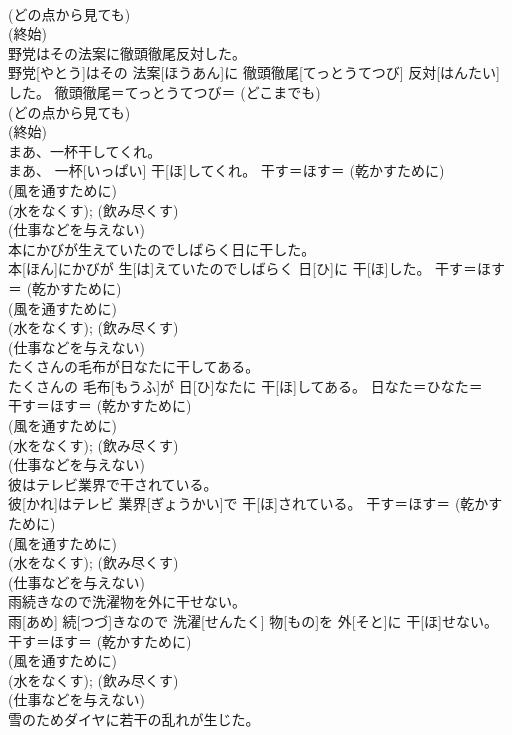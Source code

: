 \documentclass[8pt]{extreport}
\begin{document}
\begin{CJK}{UTF8}{min}
{\\	(どの点から見ても) 
\\	(終始) 
\\	野党はその法案に徹頭徹尾反対した。	
\\	野党[やとう]はその 法案[ほうあん]に 徹頭徹尾[てっとうてつび] 反対[はんたい]した。	徹頭徹尾＝てっとうてつび＝ (どこまでも) 
\\	(どの点から見ても) 
\\	(終始) 
\\	まあ、一杯干してくれ。	
\\	まあ、 一杯[いっぱい] 干[ほ]してくれ。	干す＝ほす＝ (乾かすために) 
\\	(風を通すために) 
\\	(水をなくす); (飲み尽くす) 
\\	(仕事などを与えない)
\\	本にかびが生えていたのでしばらく日に干した。	
\\	本[ほん]にかびが 生[は]えていたのでしばらく 日[ひ]に 干[ほ]した。	干す＝ほす＝ (乾かすために) 
\\	(風を通すために) 
\\	(水をなくす); (飲み尽くす) 
\\	(仕事などを与えない)
\\	たくさんの毛布が日なたに干してある。	
\\	たくさんの 毛布[もうふ]が 日[ひ]なたに 干[ほ]してある。	日なた＝ひなた＝ 
\\	干す＝ほす＝ (乾かすために) 
\\	(風を通すために) 
\\	(水をなくす); (飲み尽くす) 
\\	(仕事などを与えない)
\\	彼はテレビ業界で干されている。	
\\	彼[かれ]はテレビ 業界[ぎょうかい]で 干[ほ]されている。	干す＝ほす＝ (乾かすために) 
\\	(風を通すために) 
\\	(水をなくす); (飲み尽くす) 
\\	(仕事などを与えない)
\\	雨続きなので洗濯物を外に干せない。	
\\	雨[あめ] 続[つづ]きなので 洗濯[せんたく] 物[もの]を 外[そと]に 干[ほ]せない。	干す＝ほす＝ (乾かすために) 
\\	(風を通すために) 
\\	(水をなくす); (飲み尽くす) 
\\	(仕事などを与えない)
\\	雪のためダイヤに若干の乱れが生じた。	
}
\end{CJK}
\end{document}
